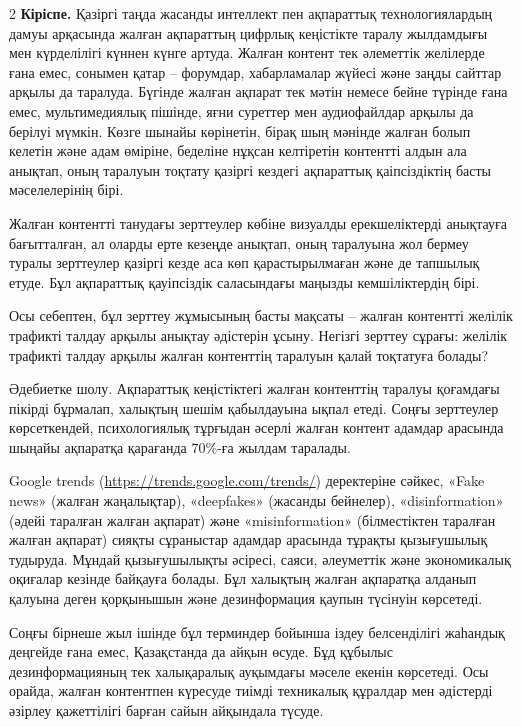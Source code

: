 \begin{multicols}{2}
{\bfseries Кіріспе.} Қазіргі таңда жасанды интеллект пен ақпараттық
технологиялардың дамуы арқасында жалған ақпараттың цифрлық кеңістікте
таралу жылдамдығы мен күрделілігі күннен күнге артуда. Жалған контент
тек әлеметтік желілерде ғана емес, сонымен қатар -- форумдар,
хабарламалар жүйесі және заңды сайттар арқылы да таралуда. Бүгінде
жалған ақпарат тек мәтін немесе бейне түрінде ғана емес, мультимедиялық
пішінде, яғни суреттер мен аудиофайлдар арқылы да берілуі мүмкін. Көзге
шынайы көрінетін, бірақ шың мәнінде жалған болып келетін және адам
өміріне, беделіне нұқсан келтіретін контентті алдын ала анықтап, оның
таралуын тоқтату қазіргі кездегі ақпараттық қаіпсіздіктің басты
мәселелерінің бірі.

Жалған контентті танудағы зерттеулер көбіне визуалды ерекшеліктерді
анықтауға бағытталған, ал оларды ерте кезеңде анықтап, оның таралуына
жол бермеу туралы зерттеулер қазіргі кезде аса көп қарастырылмаған және
де тапшылық етуде. Бұл ақпараттық қауіпсіздік саласындағы маңызды
кемшіліктердің бірі.

Осы себептен, бұл зерттеу жұмысының басты мақсаты -- жалған контентті
желілік трафикті талдау арқылы анықтау әдістерін ұсыну. Негізгі зерттеу
сұрағы: желілік трафикті талдау арқылы жалған контенттің таралуын қалай
тоқтатуға болады?

Әдебиетке шолу. Ақпараттық кеңістіктегі жалған контенттің таралуы
қоғамдағы пікірді бұрмалап, халықтың шешім қабылдауына ықпал етеді.
Соңғы зерттеулер көрсеткендей, психологиялық тұрғыдан әсерлі жалған
контент адамдар арасында шыңайы ақпаратқа қарағанда 70\%-ға жылдам
таралады.

Google trends (\url{https://trends.google.com/trends/}) деректеріне
сәйкес, «Fake news» (жалған жаңалықтар), «deepfakes» (жасанды бейнелер),
«disinformation» (әдейі таралған жалған ақпарат) және «misinformation»
(білместіктен таралған жалған ақпарат) сияқты сұраныстар адамдар
арасында тұрақты қызығушылық тудыруда. Мұндай қызығушылықты әсіресі,
саяси, әлеуметтік және экономикалық оқиғалар кезінде байқауға болады.
Бұл халықтың жалған ақпаратқа алданып қалуына деген қорқынышын және
дезинформация қаупын түсінуін көрсетеді.

Соңғы бірнеше жыл ішінде бұл терминдер бойынша іздеу белсенділігі
жаһандық деңгейде ғана емес, Қазақстанда да айқын өсуде. Бұд құбылыс
дезинформацияның тек халықаралық ауқымдағы мәселе екенін көрсетеді. Осы
орайда, жалған контентпен күресуде тиімді техникалық құралдар мен
әдістерді әзірлеу қажеттілігі барған сайын айқындала түсуде.
\end{multicols}

